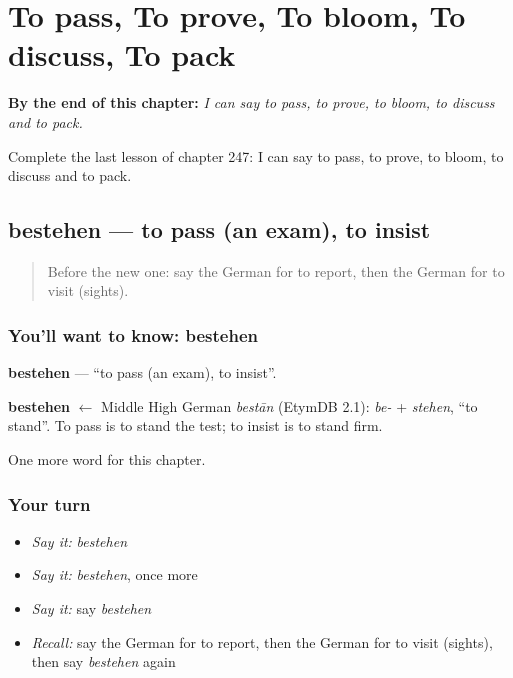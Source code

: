 
\chapter{To pass, To prove, To bloom, To discuss, To pack}
\label{ch:ge-to-pass-to-prove-to-bloom-to-discuss-to-pack}

\begin{chapteropening}
\textbf{By the end of this chapter:} \emph{I can say to pass, to prove, to bloom, to discuss and to pack.}

Complete the last lesson of chapter 247: I can say to pass, to prove, to bloom, to discuss and to pack.
\end{chapteropening}

\section[bestehen]{bestehen — to pass (an exam), to insist}

\label{lesson:GE-C247-bestehen}



\begin{quote}
Before the new one: say the German for to report, then the German for to visit (sights).
\end{quote}

\subsection*{You'll want to know: bestehen}
\textbf{bestehen} — \textquotedblleft{}to pass (an exam), to insist\textquotedblright{}.

\begin{cousinweb}
\textbf{bestehen} $\leftarrow$ Middle High German \emph{bestān} (EtymDB 2.1): \emph{be-} + \emph{stehen}, \textquotedblleft{}to stand\textquotedblright{}. To pass is to stand the test; to insist is to stand firm.
\end{cousinweb}

\begin{grammarlens}[title={What you've built}]
One more word for this chapter.
\end{grammarlens}

\subsection*{Your turn}
\begin{itemize}
\raggedright
  \item \emph{Say it:} \emph{bestehen}
  \item \emph{Say it:} \emph{bestehen}, once more
  \item \emph{Say it:} say \emph{bestehen}
  \item \emph{Recall:} say the German for to report, then the German for to visit (sights), then say \emph{bestehen} again
\end{itemize}

